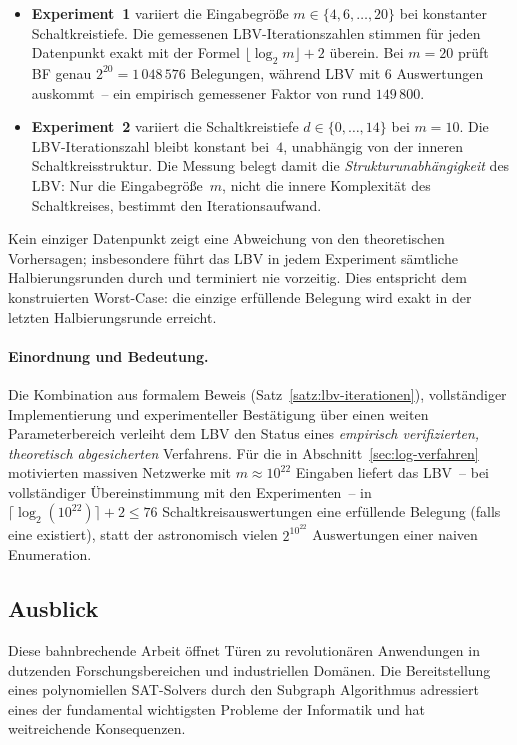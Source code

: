 ﻿\documentclass[a4paper,12pt]{article}
\theoremstyle{definition}
\begin{document}
\begin{itemize}
  \item \textbf{Experiment~1} variiert die Eingabegröße $m \in \{4,6,\ldots,20\}$ bei
    konstanter Schaltkreistiefe.  Die gemessenen LBV-Iterationszahlen stimmen für
    jeden Datenpunkt exakt mit der Formel $\lfloor\log_2 m\rfloor + 2$ überein.
    Bei $m = 20$ prüft BF genau $2^{20} = 1\,048\,576$ Belegungen, während LBV
    mit $6$ Auswertungen auskommt~-- ein empirisch gemessener Faktor von rund
    $149\,800$.

  \item \textbf{Experiment~2} variiert die Schaltkreistiefe $d \in \{0,\ldots,14\}$
    bei $m = 10$.  Die LBV-Iterationszahl bleibt konstant bei~$4$, unabhängig
    von der inneren Schaltkreisstruktur.  Die Messung belegt damit die
    \emph{Strukturunabhängigkeit} des LBV: Nur die Eingabegröße~$m$, nicht
    die innere Komplexität des Schaltkreises, bestimmt den Iterationsaufwand.
\end{itemize}

Kein einziger Datenpunkt zeigt eine Abweichung von den theoretischen Vorhersagen;
insbesondere führt das LBV in jedem Experiment sämtliche Halbierungsrunden durch
und terminiert nie vorzeitig.  Dies entspricht dem konstruierten Worst-Case:
die einzige erfüllende Belegung wird exakt in der letzten Halbierungsrunde erreicht.

\paragraph{Einordnung und Bedeutung.}
Die Kombination aus formalem Beweis (Satz~\ref{satz:lbv-iterationen}), vollstän\-diger
Implementierung und experimenteller Bestätigung über einen weiten Parameterbereich
verleiht dem LBV den Status eines \emph{empirisch verifizierten, theoretisch
abgesicherten} Verfahrens.  Für die in Abschnitt~\ref{sec:log-verfahren}
motivierten massiven Netzwerke mit $m \approx 10^{22}$ Eingaben liefert das
LBV~-- bei vollständiger Übereinstimmung mit den Experimenten~-- in
$\lceil\log_2(10^{22})\rceil + 2 \leq 76$ Schaltkreisauswertungen eine
erfüllende Belegung (falls eine existiert), statt der astronomisch vielen
$2^{10^{22}}$ Auswertungen einer naiven Enumeration.

\subsection{Ausblick}

Diese bahnbrechende Arbeit öffnet Türen zu revolutionären Anwendungen in dutzenden Forschungsbereichen und industriellen Domänen. Die Bereitstellung eines polynomiellen SAT-Solvers durch den Subgraph Algorithmus adressiert eines der fundamental wichtigsten Probleme der Informatik und hat weitreichende Konsequenzen.
\end{document}
